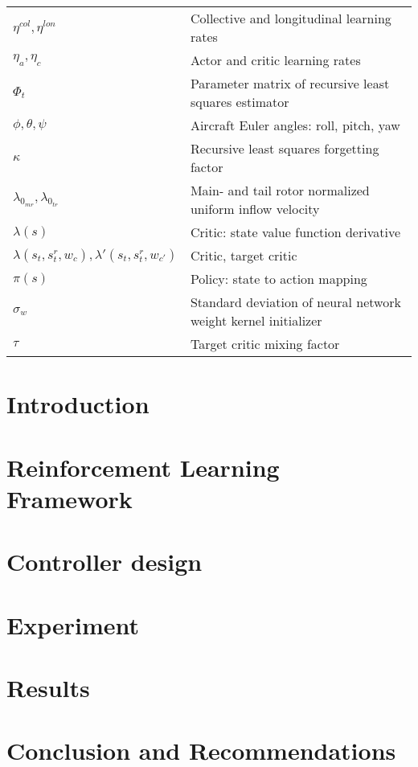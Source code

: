\documentclass[conf]{new-aiaa} %
\begin{document}
{\begin{longtable*}{@{}l @{\quad=\quad} l@{}}
$\eta^{col}, \eta^{lon}$ & Collective and longitudinal learning rates \\
$\eta_a, \eta_c$    & Actor and critic learning rates \\
$\Phi_t$            & Parameter matrix of recursive least squares estimator \\
$\phi, \theta, \psi$ & Aircraft Euler angles: roll, pitch, yaw \\
$\kappa$            & Recursive least squares forgetting factor \\
$\lambda_{0_{mr}}, \lambda_{0_{tr}}$ & Main- and tail rotor normalized uniform inflow velocity \\
$\lambda(s) $       & Critic: state value function derivative \\
$\lambda(s_t, s_t^r, w_c), \lambda'(s_t, s_t^r, w_{c'})$ & Critic, target critic \\
$\pi(s)$            & Policy: state to action mapping \\
$\sigma_w$          & Standard deviation of neural network weight kernel initializer \\
$\tau$              & Target critic mixing factor \\
\end{longtable*}}

\section{Introduction} \label{sec:introduction}

\section{Reinforcement Learning Framework} \label{sec:framework}
 
\section{Controller design} \label{sec:controller}
 
\section{Experiment} \label{sec:experiment}

\section{Results}\label{sec:results}
 
\section{Conclusion and Recommendations}\label{sec:conclusions}
 

\FloatBarrier

\end{document}

